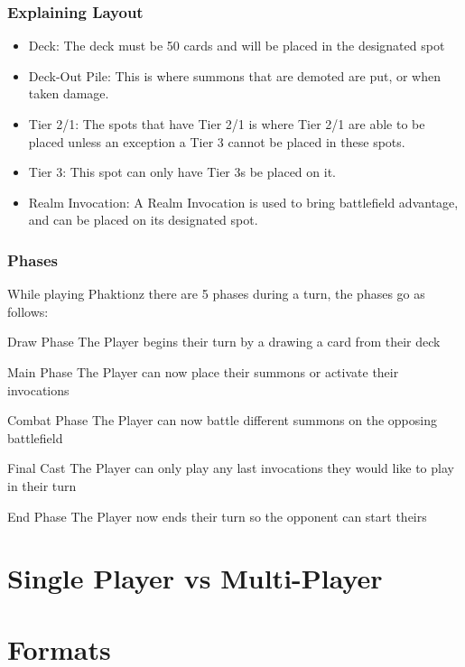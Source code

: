 \documentclass{beamer}
\begin{document}
\begin{frame}
    \frametitle{Explaining Layout}
\begin{itemize}
    \item Deck: The deck must be 50 cards and will be placed in the designated spot 
    \item Deck-Out Pile: This is where summons that are demoted are put, or when taken damage. 
    \item Tier 2/1: The spots that have Tier 2/1 is where Tier 2/1 are able to be placed unless an exception a Tier 3 cannot be placed in these spots. 
    \item Tier 3: This spot can only have Tier 3s be placed on it. 
    \item Realm Invocation: A Realm Invocation is used to bring battlefield advantage, and can be placed on its designated spot. 
\end{itemize}
    

\end{frame}



\begin{frame}
    \frametitle{Phases}
    \textrm{While playing Phaktionz there are 5 phases during a turn, the phases go as follows:} 
    \begin{alertblock}{Draw Phase}
        \textrm{The Player begins their turn by a drawing a card from their deck}
    \end{alertblock}
    \begin{alertblock}{Main Phase}
       \textrm{The Player can now place their summons or activate their invocations}
    \end{alertblock}
    \begin{alertblock}{Combat Phase}
        \textrm{The Player can now battle different summons on the opposing battlefield}
    \end{alertblock}
    \begin{alertblock}{Final Cast}
        \textrm{The Player can only play any last invocations they would like to play in their turn}
    \end{alertblock}
    \begin{alertblock}{End Phase}
        \textrm{The Player now ends their turn so the opponent can start theirs}
    \end{alertblock}

\end{frame}




\section{Single Player vs Multi-Player}





\section{Formats}
\end{document}
